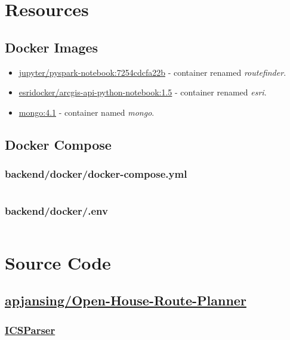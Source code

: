 \chapter{Resources}
\section{Docker Images}\label{docker-images}
\begin{itemize}
  \item \href{https://hub.docker.com/r/jupyter/pyspark-notebook}{jupyter/pyspark-notebook:7254cdcfa22b}\cite{img-pyspark} - container renamed \emph{routefinder}.
  \item \href{https://hub.docker.com/r/esridocker/arcgis-api-python-notebook}{esridocker/arcgis-api-python-notebook:1.5}\cite{img-esri} - container renamed \emph{esri}.
  \item \href{https://hub.docker.com/_/mongo}{mongo:4.1}\cite{img-mongo} - container named \emph{mongo}.
\end{itemize}


\section{Docker Compose}

\subsection{backend/docker/docker-compose.yml}
\inputminted{yaml}{../backend/docker/docker-compose.yml}
\subsection{backend/docker/.env}
\inputminted{yaml}{../backend/docker/.env}


\chapter{Source Code}\label{code}
\section{\href{https://github.com/apjansing/Open-House-Route-Planner}{apjansing/Open-House-Route-Planner}}

\subsection{\href{https://github.com/apjansing/Open-House-Route-Planner/blob/master/backend/docker/persistence/pyspark/ICSParser.py}{ICSParser}} \label{ICSParser}

